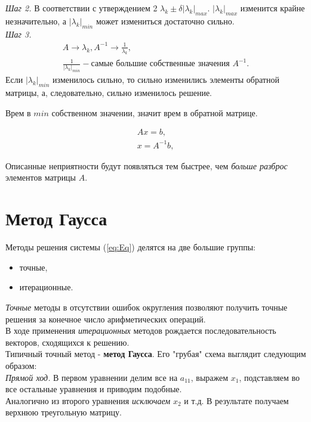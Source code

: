\documentclass[a4paper,11pt]{article}
\begin{document}
\textit{Шаг 2.} В соответствии с утверждением 2 $\lambda_k\pm\delta|\lambda_k|_{max}$.
  $|\lambda_k|_{max}$ изменится крайне незначительно, а $|\lambda_k|_{min}$ может измениться достаточно сильно. \\

\textit{Шаг 3.}
  \begin{gather*}
    A \rightarrow \lambda_k, A^{-1} \rightarrow \frac{1}{\lambda_k}, \\
    \frac{1}{|\lambda_k|_{min}} - \text{самые большие собственные значения } A^{-1}.
  \end{gather*}
  Если $|\lambda_k|_{min}$ изменилось сильно, то сильно изменились элементы обратной матрицы, а, следовательно, сильно изменилось решение.
  \begin{importantblock}
    Врем в $min$ собственном значении, значит врем в обратной матрице.
  \end{importantblock}
\begin{gather*}
  Ax=b, \\
  x=A^{-1}b,
\end{gather*}

Описанные неприятности будут появляться тем быстрее, чем \textit{больше разброс} элементов матрицы $A$.

\section{Метод Гаусса}
Методы решения системы (\ref{eq:Eq}) делятся на две большие группы:
\begin{itemize}
  \item точные,
  \item итерационные.
\end{itemize}
\textit{Точные} методы в отсутствии ошибок округления позволяют получить точные решения за конечное число арифметических операций. \\
В ходе применения \textit{итерационных} методов рождается последовательность векторов, сходящихся к решению. \\

Типичный точный метод - \textbf{метод Гаусса}. Его "грубая" схема выглядит следующим образом: \\

\noindent \textit{Прямой ход.} В первом уравнении делим все на $a_{11}$, выражем $x_1$, подставляем во все остальные уравнения и приводим подобные. \\
Аналогично из второго уравнения \textit{исключаем} $x_2$ и т.д. В результате получаем верхнюю треугольную матрицу.\\
\end{document}
